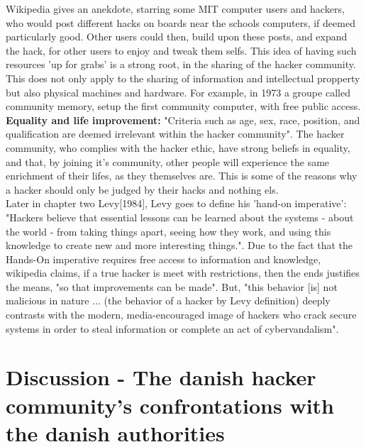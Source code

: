 \documentclass[paper=a4, fontsize=11pt]{scrartcl} %
\numberwithin{equation}{section} %
\numberwithin{figure}{section} %
\numberwithin{table}{section} %
\begin{document}
	Wikipedia gives an anekdote, starring some MIT computer users and hackers, who would post different hacks on boards near the schools computers, if deemed particularly good. Other users could then, build upon these posts, and expand the hack, for other users to enjoy and tweak them selfs\cite{HE11}.  This idea of having such resources 'up for grabs' is a strong root, in the sharing of the hacker community. This does not only apply to the sharing of information and intellectual propperty but also physical machines and hardware. For example, in 1973 a groupe called community memory, setup the first community computer, with free public access.\cite{HE11}\cite{CM}\\  
	
	\textbf{Equality and life improvement:} "Criteria such as age, sex, race, position, and qualification are deemed irrelevant within the hacker community"\cite{HE1}. The hacker community, who complies with the hacker ethic, have strong beliefs in equality, and that, by joining it's community, other people will experience the same enrichment of their lifes, as they themselves are. This is some of the reasons why a hacker should only be judged by their hacks and nothing els\cite{HE1}. \\ 
	
	Later in chapter two Levy[1984], Levy goes to define his 'hand-on imperative': "Hackers believe that essential lessons can be learned about the systems - about the world - from taking things apart, seeing how they work, and using this knowledge to create new and more interesting things."\cite{HE12}. Due to the fact that the Hands-On imperative requires free access to information and knowledge, wikipedia claims, if a true hacker is meet with restrictions, then the ends justifies the means, "so that improvements can be made"\cite{HE12}. But, "this behavior [is] not malicious in nature ... (the behavior of a hacker by Levy definition) deeply contrasts with the modern, media-encouraged image of hackers who crack secure systems in order to steal information or complete an act of cybervandalism"\cite{HE12}.  
	
	\section{Discussion - The danish hacker community's confrontations with the danish authorities}
	
\end{document}
